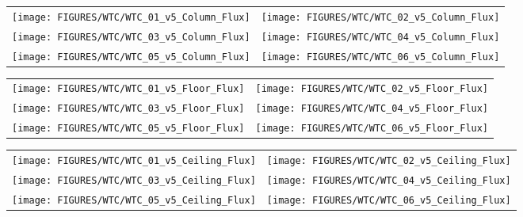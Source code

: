 \clearpage

\begin{figure}[h!]
\begin{tabular*}{\textwidth}{l@{\extracolsep{\fill}}r}
\texttt{[image: FIGURES/WTC/WTC\_01\_v5\_Column\_Flux]} &
\texttt{[image: FIGURES/WTC/WTC\_02\_v5\_Column\_Flux]} \\
\texttt{[image: FIGURES/WTC/WTC\_03\_v5\_Column\_Flux]} &
\texttt{[image: FIGURES/WTC/WTC\_04\_v5\_Column\_Flux]} \\
\texttt{[image: FIGURES/WTC/WTC\_05\_v5\_Column\_Flux]} &
\texttt{[image: FIGURES/WTC/WTC\_06\_v5\_Column\_Flux]}
\end{tabular*}
\label{NIST_WTC_Column_Flux}
\end{figure}

\clearpage

\begin{figure}[h!]
\begin{tabular*}{\textwidth}{l@{\extracolsep{\fill}}r}
\texttt{[image: FIGURES/WTC/WTC\_01\_v5\_Floor\_Flux]} &
\texttt{[image: FIGURES/WTC/WTC\_02\_v5\_Floor\_Flux]} \\
\texttt{[image: FIGURES/WTC/WTC\_03\_v5\_Floor\_Flux]} &
\texttt{[image: FIGURES/WTC/WTC\_04\_v5\_Floor\_Flux]} \\
\texttt{[image: FIGURES/WTC/WTC\_05\_v5\_Floor\_Flux]} &
\texttt{[image: FIGURES/WTC/WTC\_06\_v5\_Floor\_Flux]}
\end{tabular*}
\label{NIST_WTC_Floor_Flux}
\end{figure}

\clearpage

\begin{figure}[h!]
\begin{tabular*}{\textwidth}{l@{\extracolsep{\fill}}r}
\texttt{[image: FIGURES/WTC/WTC\_01\_v5\_Ceiling\_Flux]} &
\texttt{[image: FIGURES/WTC/WTC\_02\_v5\_Ceiling\_Flux]} \\
\texttt{[image: FIGURES/WTC/WTC\_03\_v5\_Ceiling\_Flux]} &
\texttt{[image: FIGURES/WTC/WTC\_04\_v5\_Ceiling\_Flux]} \\
\texttt{[image: FIGURES/WTC/WTC\_05\_v5\_Ceiling\_Flux]} &
\texttt{[image: FIGURES/WTC/WTC\_06\_v5\_Ceiling\_Flux]}
\end{tabular*}
\label{NIST_WTC_Ceiling_Flux}
\end{figure}

\clearpage




